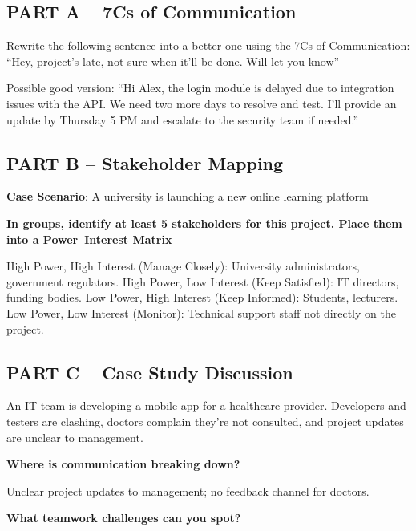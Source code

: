 \subsection{PART A – 7Cs of Communication}

\indent 

Rewrite the following sentence into a better one using the 7Cs of Communication: “Hey, project’s late, not sure when it’ll be done. Will let you know”

Possible good version: “Hi Alex, the login module is delayed due to integration issues with the API. We need two more days to resolve and test. I’ll provide an update by Thursday 5 PM and escalate to the security team if needed.”

\subsection{PART B – Stakeholder Mapping}

\indent 

\textbf{Case Scenario}: A university is launching a new online learning platform

\noindent\textbf{In groups, identify at least 5 stakeholders for this project. Place them into a Power–Interest Matrix}

High Power, High Interest (Manage Closely): University administrators, government regulators.
High Power, Low Interest (Keep Satisfied): IT directors, funding bodies.
Low Power, High Interest (Keep Informed): Students, lecturers.
Low Power, Low Interest (Monitor): Technical support staff not directly on the project.

\subsection{PART C – Case Study Discussion}

\indent 

An IT team is developing a mobile app for a healthcare provider. Developers and testers are clashing, doctors complain they’re not consulted, and project updates are unclear to management.

\bigskip

\noindent\textbf{Where is communication breaking down?}

Unclear project updates to management; no feedback channel for doctors.

\bigskip

\noindent\textbf{What teamwork challenges can you spot?}



